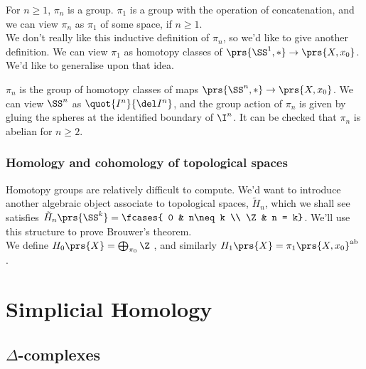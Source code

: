 \documentclass[10pt,a4paper,twoside,openany,hidelinks]{book}
\begin{document}
For $n \geq 1$, $\pi_n$ is a group. $\pi_1$ is a group with the operation of concatenation, and we can view $\pi_n$ as $\pi_1$ of some space, if $n \geq 1$. \\
We don't really like this inductive definition of $\pi_n$, so we'd like to give another definition. We can view $\pi_1$ as homotopy classes of $\prs{\SS^1, *} \to \prs{X, x_0}$. We'd like to generalise upon that idea. \\
\begin{definition}
$\pi_n$ is the group of homotopy classes of maps $\prs{\SS^n, *} \to \prs{X, x_0}$. We can view $\SS^n$ as $\quot{I^n}{\del I^n}$, and the group action of $\pi_n$ is given by gluing the spheres at the identified boundary of $\I^n$. It can be checked that $\pi_n$ is abelian for $n \geq 2$.
\end{definition}

\subsection{Homology and cohomology of topological spaces}
Homotopy groups are relatively difficult to compute. We'd want to introduce another algebraic object associate to topological spaces, $\tilde{H}_n$, which we shall see satisfies $\tilde{H}_n\prs{\SS^k} = \fcases{ 0 & n\neq k \\ \Z & n = k}$. We'll use this structure to prove Brouwer's theorem. \\
We define $H_0\prs{X} = \bigoplus_{\pi_0} \Z$ , and similarly  $H_1\prs{X} = \pi_1\prs{X,x_0}^{\mathrm{ab}}$ .

\chapter{Simplicial Homology}
\section{$\Delta$-complexes}
\end{document}
